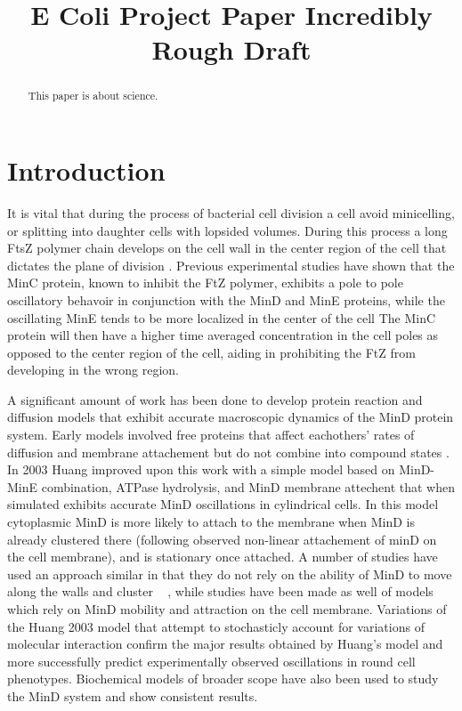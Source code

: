 \documentclass[letterpaper,twocolumn,amsmath,amssymb,pre]{revtex4-1}
\begin{document}
\title{E Coli Project Paper Incredibly Rough Draft}

\begin{abstract}
  This paper is about science.
\end{abstract}
\section{Introduction}
It is vital that during the process of bacterial cell division a cell
avoid minicelling, or splitting into daughter cells with lopsided
volumes.  During this process a long FtsZ polymer chain develops on
the cell wall in the center region of the cell that dictates the plane
of division\cite{adams2009bacterial}
\cite{lutkenhaus2007assembly}. Previous experimental studies have
shown that the MinC protein, known to inhibit the FtZ
polymer\cite{shen2010examination}, exhibits a pole to pole oscillatory
behavoir in conjunction with the MinD and MinE proteins, while the
oscillating MinE tends to be more localized in the center of the cell
\cite{hu1999topological} \cite{fu2001mine} \cite{shapiro2009and}
\cite{yu1999ftsz} \cite{raskin1999rapid}The MinC protein will then have a higher time
averaged concentration in the cell poles as opposed to the center
region of the cell, aiding in prohibiting the FtZ from developing in the wrong
region.

A significant amount of work has been done to develop protein reaction
and diffusion models that exhibit accurate macroscopic dynamics of the
MinD protein system. Early models involved free proteins that affect
eachothers' rates of diffusion and membrane attachement but do not
combine into compound states\cite{meinhardt2001pattern} .  In 2003
Huang \cite{huang2003dynamic} improved upon this work with a simple
model based on MinD-MinE combination, ATPase hydrolysis, and MinD
membrane attechent that when simulated exhibits accurate MinD
oscillations in cylindrical cells\cite{huang2003dynamic}. In this
model cytoplasmic MinD is more likely to attach to the membrane when
MinD is already clustered there (following observed non-linear
attachement of minD on the cell membrane), and is stationary once
attached.  A number of studies have used an approach similar in that
they do not rely on the ability of MinD to move along the walls and
cluster ~\cite{kruse2007experimentalist} \cite{meinhardt2001pattern}
\cite{drew2005polymerization} \cite{fange2006noise}, while studies
have been made as well of models which rely on MinD mobility and
attraction on the cell
membrane\cite{kruse2002dynamic}\cite{howard2005cellular}.  Variations
of the Huang 2003 model that attempt to stochasticly account for
variations of molecular interaction confirm the major results obtained
by Huang's model and more successfully predict experimentally observed
oscillations in round cell phenotypes.\cite{drew2005polymerization}
\cite{fange2006noise} \cite{huang2004min} Biochemical models of
broader scope have also been used to study the MinD system and show
consistent results.\cite{arjunan2010new}
\end{document}

